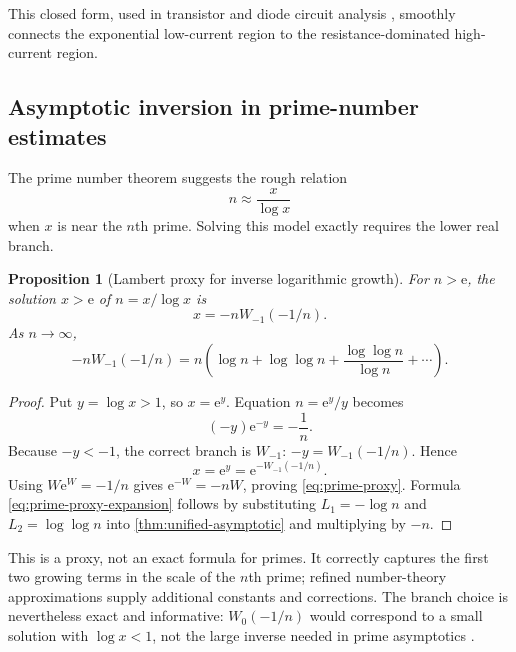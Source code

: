 \documentclass[11pt]{article}
\numberwithin{equation}{section}
\newtheorem{proposition}[theorem]{Proposition}
\theoremstyle{definition}
\theoremstyle{remark}
\newcommand{\e}{\mathrm e}
\begin{document}
This closed form, used in transistor and diode circuit analysis
\cite{Banwell2000}, smoothly connects the exponential low-current region to
the resistance-dominated high-current region.

\subsection{Asymptotic inversion in prime-number estimates}

The prime number theorem suggests the rough relation
\begin{equation}
  n\approx\frac{x}{\log x}                             \label{eq:pnt-inversion-model}
\end{equation}
when $x$ is near the $n$th prime.  Solving this model exactly requires the
lower real branch.

\begin{proposition}[Lambert proxy for inverse logarithmic growth]
\label{prop:prime-proxy}
For $n>\e$, the solution $x>\e$ of
$n=x/\log x$ is
\begin{equation}
  x=-nW_{-1}(-1/n).                                    \label{eq:prime-proxy}
\end{equation}
As $n\to\infty$,
\begin{equation}
 -nW_{-1}(-1/n)
 =n\left(\log n+\log\log n
   +\frac{\log\log n}{\log n}+\cdots\right).          \label{eq:prime-proxy-expansion}
\end{equation}
\end{proposition}

\begin{proof}
Put $y=\log x>1$, so $x=\e^y$.  Equation
$n=\e^y/y$ becomes
\[
 (-y)\e^{-y}=-\frac1n.
\]
Because $-y<-1$, the correct branch is $W_{-1}$:
$-y=W_{-1}(-1/n)$.  Hence
\[
 x=\e^y=\e^{-W_{-1}(-1/n)}.
\]
Using $W\e^W=-1/n$ gives $\e^{-W}=-nW$, proving
\eqref{eq:prime-proxy}.  Formula \eqref{eq:prime-proxy-expansion} follows by
substituting $L_1=-\log n$ and $L_2=\log\log n$ into
\cref{thm:unified-asymptotic} and multiplying by $-n$.
\end{proof}

This is a proxy, not an exact formula for primes.  It correctly captures the
first two growing terms in the scale of the $n$th prime; refined number-theory
approximations supply additional constants and corrections.  The branch
choice is nevertheless exact and informative: $W_0(-1/n)$ would correspond
to a small solution with $\log x<1$, not the large inverse needed in prime
asymptotics \cite{Visser2018}.
\end{document}
